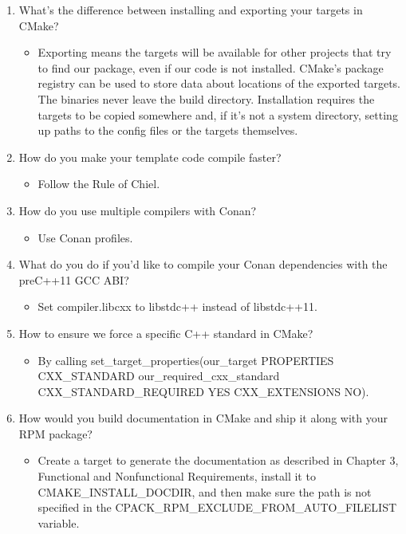 \begin{enumerate}
\item
What's the difference between installing and exporting your targets in CMake?
\begin{itemize}
\item 
Exporting means the targets will be available for other projects that try to find our package, even if our code is not installed. CMake's package registry can be used to store data about locations of the exported targets. The binaries never leave the build directory. Installation requires the targets to be copied somewhere and, if it's not a system directory, setting up paths to the config files or the targets themselves.
\end{itemize}

\item
How do you make your template code compile faster?
\begin{itemize}
\item 
Follow the Rule of Chiel.
\end{itemize}

\item
How do you use multiple compilers with Conan?
\begin{itemize}
\item 
Use Conan profiles.
\end{itemize}

\item
What do you do if you'd like to compile your Conan dependencies with the preC++11 GCC ABI?
\begin{itemize}
\item 
Set compiler.libcxx to libstdc++ instead of libstdc++11.
\end{itemize}

\item
How to ensure we force a specific C++ standard in CMake?
\begin{itemize}
\item 
By calling set\_target\_properties(our\_target PROPERTIES
CXX\_STANDARD our\_required\_cxx\_standard
CXX\_STANDARD\_REQUIRED YES CXX\_EXTENSIONS NO).
\end{itemize}

\item
How would you build documentation in CMake and ship it along with your RPM package?
\begin{itemize}
\item 
Create a target to generate the documentation as described in Chapter 3, Functional and Nonfunctional Requirements, install it to CMAKE\_INSTALL\_DOCDIR, and then make sure the path is not specified in the CPACK\_RPM\_EXCLUDE\_FROM\_AUTO\_FILELIST variable.
\end{itemize}
\end{enumerate}